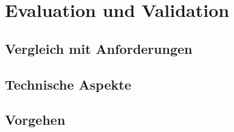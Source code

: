 \chapter{Evaluation und Validation}
\label{ch:Eval}


\section{Vergleich mit Anforderungen}
\label{sec:VergleichAnforderungen}

\section{Technische Aspekte}

\section{Vorgehen}
